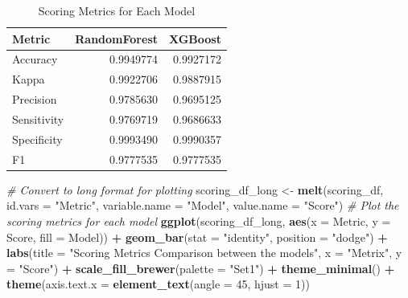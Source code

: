 \documentclass[
]{article}
\newenvironment{Shaded}{\begin{snugshade}}{\end{snugshade}}
\newcommand{\AttributeTok}[1]{\textcolor[rgb]{0.13,0.29,0.53}{#1}}
\newcommand{\CommentTok}[1]{\textcolor[rgb]{0.56,0.35,0.01}{\textit{#1}}}
\newcommand{\DecValTok}[1]{\textcolor[rgb]{0.00,0.00,0.81}{#1}}
\newcommand{\FunctionTok}[1]{\textcolor[rgb]{0.13,0.29,0.53}{\textbf{#1}}}
\newcommand{\NormalTok}[1]{#1}
\newcommand{\OtherTok}[1]{\textcolor[rgb]{0.56,0.35,0.01}{#1}}
\newcommand{\SpecialCharTok}[1]{\textcolor[rgb]{0.81,0.36,0.00}{\textbf{#1}}}
\newcommand{\StringTok}[1]{\textcolor[rgb]{0.31,0.60,0.02}{#1}}
\begin{document}
\begin{longtable}[l]{lrr}
\caption{\label{tab:scoring_metrics}Scoring Metrics for Each Model}\\
\toprule
Metric & RandomForest & XGBoost\\
\midrule
Accuracy & 0.9949774 & 0.9927172\\
Kappa & 0.9922706 & 0.9887915\\
Precision & 0.9785630 & 0.9695125\\
Sensitivity & 0.9769719 & 0.9686633\\
Specificity & 0.9993490 & 0.9990357\\
\addlinespace
F1 & 0.9777535 & 0.9777535\\
\bottomrule
\end{longtable}

\begin{Shaded}
\begin{Highlighting}[]
\CommentTok{\# Convert to long format for plotting}
\NormalTok{scoring\_df\_long }\OtherTok{\textless{}{-}} \FunctionTok{melt}\NormalTok{(scoring\_df, }\AttributeTok{id.vars =} \StringTok{"Metric"}\NormalTok{,}
                        \AttributeTok{variable.name =} \StringTok{"Model"}\NormalTok{, }\AttributeTok{value.name =} \StringTok{"Score"}\NormalTok{)}
\CommentTok{\# Plot the scoring metrics for each model}
\FunctionTok{ggplot}\NormalTok{(scoring\_df\_long, }\FunctionTok{aes}\NormalTok{(}\AttributeTok{x =}\NormalTok{ Metric, }\AttributeTok{y =}\NormalTok{ Score, }\AttributeTok{fill =}\NormalTok{ Model)) }\SpecialCharTok{+}
  \FunctionTok{geom\_bar}\NormalTok{(}\AttributeTok{stat =} \StringTok{"identity"}\NormalTok{, }\AttributeTok{position =} \StringTok{"dodge"}\NormalTok{) }\SpecialCharTok{+}
  \FunctionTok{labs}\NormalTok{(}\AttributeTok{title =} \StringTok{"Scoring Metrics Comparison between the models"}\NormalTok{,}
       \AttributeTok{x =} \StringTok{"Metrix"}\NormalTok{, }\AttributeTok{y =} \StringTok{"Score"}\NormalTok{) }\SpecialCharTok{+}
  \FunctionTok{scale\_fill\_brewer}\NormalTok{(}\AttributeTok{palette =} \StringTok{"Set1"}\NormalTok{) }\SpecialCharTok{+}
  \FunctionTok{theme\_minimal}\NormalTok{() }\SpecialCharTok{+}
  \FunctionTok{theme}\NormalTok{(}\AttributeTok{axis.text.x =} \FunctionTok{element\_text}\NormalTok{(}\AttributeTok{angle =} \DecValTok{45}\NormalTok{, }\AttributeTok{hjust =} \DecValTok{1}\NormalTok{))}
\end{Highlighting}
\end{Shaded}
\end{document}
